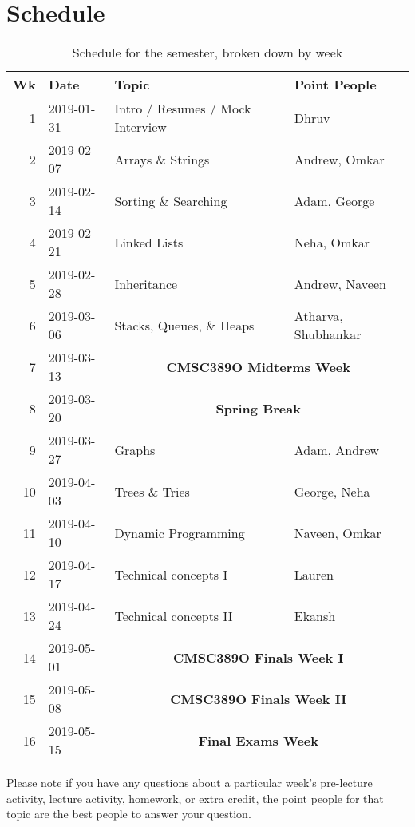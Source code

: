 \documentclass[12pt]{article}
\begin{document}
\section*{Schedule}
%
\begin{table}[H] %
  \begin{tabular}{@{}rlll}
    Wk & Date & Topic & Point People \\
    \hline
    1 & 2019-01-31 & Intro / Resumes / Mock Interview & Dhruv \\
    2 & 2019-02-07 & Arrays \& Strings                & Andrew, Omkar \\
    3 & 2019-02-14 & Sorting \& Searching             & Adam, George \\
    4 & 2019-02-21 & Linked Lists                     & Neha, Omkar \\
    5 & 2019-02-28 & Inheritance                      & Andrew, Naveen \\
    6 & 2019-03-06 & Stacks, Queues, \& Heaps         & Atharva, Shubhankar \\
    7 & 2019-03-13 & \multicolumn{2}{c}{\textbf{CMSC389O Midterms Week}} \\
    8 & 2019-03-20 & \multicolumn{2}{c}{\textbf{Spring Break}} \\
    9 & 2019-03-27 & Graphs                           & Adam, Andrew \\
    10& 2019-04-03 & Trees \& Tries                   & George, Neha \\
    11& 2019-04-10 & Dynamic Programming              & Naveen, Omkar \\
    12& 2019-04-17 & Technical concepts I             & Lauren \\
    13& 2019-04-24 & Technical concepts II            & Ekansh \\
    14& 2019-05-01 & \multicolumn{2}{c}{\textbf{CMSC389O Finals Week I}} \\
    15& 2019-05-08 & \multicolumn{2}{c}{\textbf{CMSC389O Finals Week II}} \\
    16& 2019-05-15 & \multicolumn{2}{c}{\textbf{Final Exams Week}}
  \end{tabular}
  \caption{Schedule for the semester, broken down by week}
  \label{tab:schedule}
\end{table}

Please note if you have any questions about a particular week’s pre-lecture activity, lecture activity, homework, or extra credit, the point people for that topic are the best people to answer your question.
\end{document}
